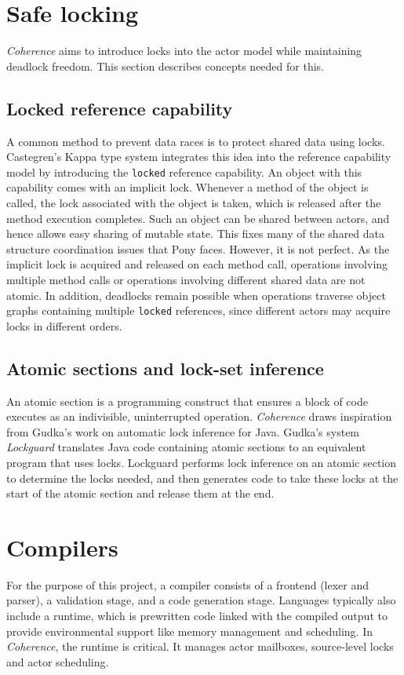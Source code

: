\section{Safe locking} \label{sec:safe_locking}
\textit{Coherence} aims to introduce locks into the actor model while maintaining deadlock freedom. This section describes concepts needed for this.

\subsection{Locked reference capability}
A common method to prevent data races is to protect shared data using locks. Castegren's Kappa type system\cite{kappa_system} integrates this idea into the reference capability model by introducing the \texttt{locked} reference capability. An object with this capability comes with an implicit lock. Whenever a method of the object is called, the lock associated with the object is taken, which is released after the method execution completes. Such an object can be shared between actors, and hence allows easy sharing of mutable state. This fixes many of the shared data structure coordination issues that Pony faces. However, it is not perfect. As the implicit lock is acquired and released on each method call, operations involving multiple method calls or operations involving different shared data are not atomic. In addition, deadlocks remain possible when operations traverse object graphs containing multiple \texttt{locked} references, since different actors may acquire locks in different orders.

\subsection{Atomic sections and lock-set inference}
An atomic section is a programming construct that ensures a block of code executes as an indivisible, uninterrupted operation. \textit{Coherence} draws inspiration from Gudka's work on automatic lock inference for Java\cite{gudka_thesis}. Gudka's system \textit{Lockguard} translates Java code containing atomic sections to an equivalent program that uses locks. Lockguard performs lock inference on an atomic section to determine the locks needed, and then generates code to take these locks at the start of the atomic section and release them at the end.

\section{Compilers} \label{sec:compiler_prep}
For the purpose of this project, a compiler consists of a frontend (lexer and parser), a validation stage, and a code generation stage. Languages typically also include a runtime, which is prewritten code linked with the compiled output to provide environmental support like memory management and scheduling. In \textit{Coherence}, the runtime is critical. It manages actor mailboxes, source-level locks and actor scheduling. 

